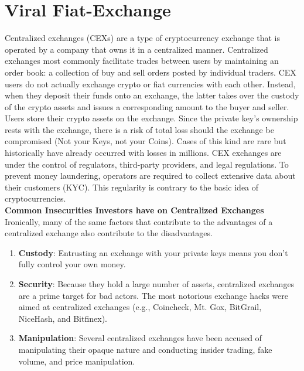 \documentclass[conference]{IEEEtran}
\begin{document}
\section{\textbf{Viral Fiat-Exchange}}

Centralized exchanges (CEXs) are a type of cryptocurrency exchange that is operated by a company that owns it in a centralized manner. Centralized exchanges most commonly facilitate trades between users by maintaining an order book: a collection of buy and sell orders posted by individual traders. CEX users do not actually exchange crypto or fiat currencies with each other. Instead, when they deposit their funds onto an exchange, the latter takes over the custody of the crypto assets and issues a corresponding amount to the buyer and seller. Users store their crypto assets on the exchange. Since the private key's ownership rests with the exchange, there is a risk of total loss should the exchange be compromised (Not your Keys, not your Coins). Cases of this kind are rare but historically have already occurred with losses in millions. CEX exchanges are under the control of regulators, third-party providers, and legal regulations. To prevent money laundering, operators are required to collect extensive data about their customers (KYC). This regularity is contrary to the basic idea of cryptocurrencies.\\

\textbf{Common Insecurities Investors have on Centralized Exchanges}\\

Ironically, many of the same factors that contribute to the advantages of a centralized exchange also contribute to the disadvantages.
\begin{enumerate}[wide, labelwidth=!, labelindent=0pt]
\item \textbf{Custody}: Entrusting an exchange with your private keys means you don’t fully control your own money.

\item \textbf{Security}: Because they hold a large number of assets, centralized exchanges are a prime target for bad actors. The most notorious exchange hacks were aimed at centralized exchanges (e.g., Coincheck, Mt. Gox, BitGrail, NiceHash, and Bitfinex).

\item \textbf{Manipulation}: Several centralized exchanges have been accused of manipulating their opaque nature and conducting insider trading, fake volume, and price manipulation.
\end{enumerate}
\end{document}
